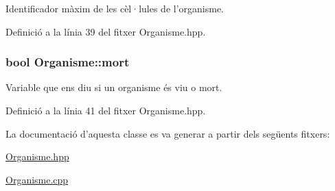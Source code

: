 Identificador màxim de les cèl·lules de l'organisme. 



Definició a la línia 39 del fitxer Organisme.\-hpp.

\hypertarget{class_organisme_ae20564db8d9ba5b7547750375010ed7b}{
\subsubsection[{mort}]{\setlength{\rightskip}{0pt plus 5cm}bool Organisme\-::mort\hspace{0.3cm}{\ttfamily [private]}}}\label{class_organisme_ae20564db8d9ba5b7547750375010ed7b}


Variable que ens diu si un organisme és viu o mort. 



Definició a la línia 41 del fitxer Organisme.\-hpp.



La documentació d'aquesta classe es va generar a partir dels següents fitxers\-:\begin{DoxyCompactItemize}
\item 
\hyperlink{_organisme_8hpp}{Organisme.\-hpp}\item 
\hyperlink{_organisme_8cpp}{Organisme.\-cpp}\end{DoxyCompactItemize}
